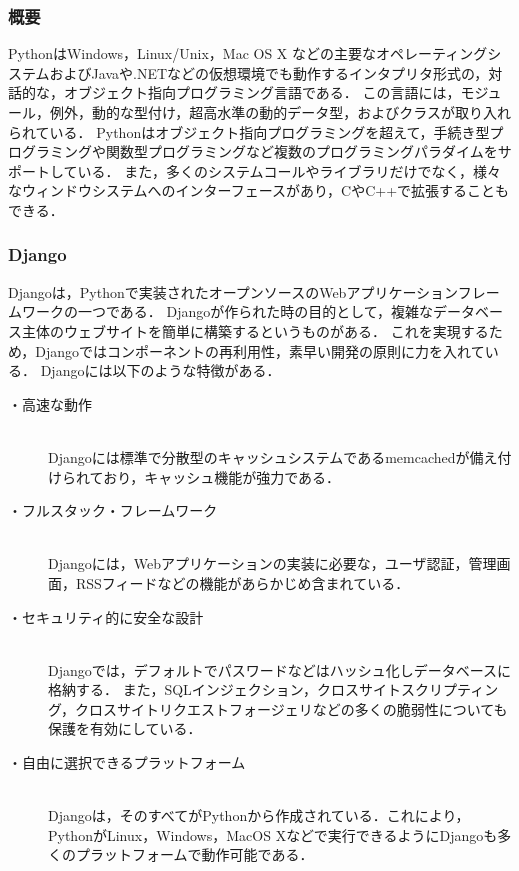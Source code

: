 \subsubsection{概要}
Python\cite{python}はWindows，Linux/Unix，Mac OS X などの主要なオペレーティングシステムおよびJavaや.NETなどの仮想環境でも動作するインタプリタ形式の，対話的な，オブジェクト指向プログラミング言語である．
この言語には，モジュール，例外，動的な型付け，超高水準の動的データ型，およびクラスが取り入れられている．
Pythonはオブジェクト指向プログラミングを超えて，手続き型プログラミングや関数型プログラミングなど複数のプログラミングパラダイムをサポートしている．
また，多くのシステムコールやライブラリだけでなく，様々なウィンドウシステムへのインターフェースがあり，C\cite{Clang}やC++\cite{cplusplus}で拡張することもできる．

\subsubsection{Django}
Django\cite{Django}は，Pythonで実装されたオープンソースのWebアプリケーションフレームワークの一つである．
Djangoが作られた時の目的として，複雑なデータベース主体のウェブサイトを簡単に構築するというものがある．
これを実現するため，Djangoではコンポーネントの再利用性，素早い開発の原則に力を入れている．
Djangoには以下のような特徴がある．

\begin{description}
    \item[・高速な動作]\mbox{}\\
        Djangoには標準で分散型のキャッシュシステムであるmemcached\cite{memcached}が備え付けられており，キャッシュ機能が強力である．
    \item[・フルスタック・フレームワーク]\mbox{}\\
        Djangoには，Webアプリケーションの実装に必要な，ユーザ認証，管理画面，RSSフィードなどの機能があらかじめ含まれている．
    \item[・セキュリティ的に安全な設計]\mbox{}\\
        Djangoでは，デフォルトでパスワードなどはハッシュ化しデータベースに格納する．
        また，SQLインジェクション，クロスサイトスクリプティング，クロスサイトリクエストフォージェリなどの多くの脆弱性についても保護を有効にしている．
    \item[・自由に選択できるプラットフォーム]\mbox{}\\
        Djangoは，そのすべてがPythonから作成されている．これにより，PythonがLinux，Windows，MacOS Xなどで実行できるようにDjangoも多くのプラットフォームで動作可能である．
\end{description}

